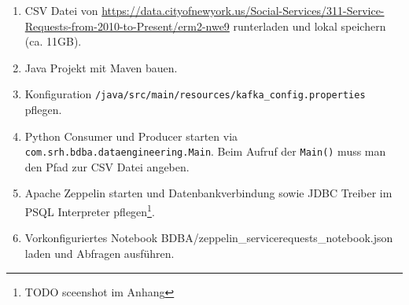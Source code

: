 \begin{enumerate}
	\item CSV Datei von \hyperref[https://data.cityofnewyork.us/Social-Services/311-Service-Requests-from-2010-to-Present/erm2-nwe9]{https://data.cityofnewyork.us/Social-Services/311-Service-Requests-from-2010-to-Present/erm2-nwe9} runterladen und lokal speichern (ca. 11GB).
	\item Java Projekt mit Maven  bauen.
	\item Konfiguration \texttt{/java/src/main/resources/kafka\_config.properties} pflegen.
	\item Python Consumer und Producer starten via \texttt{com.srh.bdba.dataengineering.Main}. Beim Aufruf der \texttt{Main()} muss man den Pfad zur CSV Datei angeben.
	\item Apache Zeppelin starten und Datenbankverbindung sowie JDBC Treiber im PSQL Interpreter pflegen\footnote{TODO sceenshot im Anhang}.
	\item Vorkonfiguriertes Notebook BDBA/zeppelin\_servicerequests\_notebook.json laden und Abfragen ausführen.
\end{enumerate}
